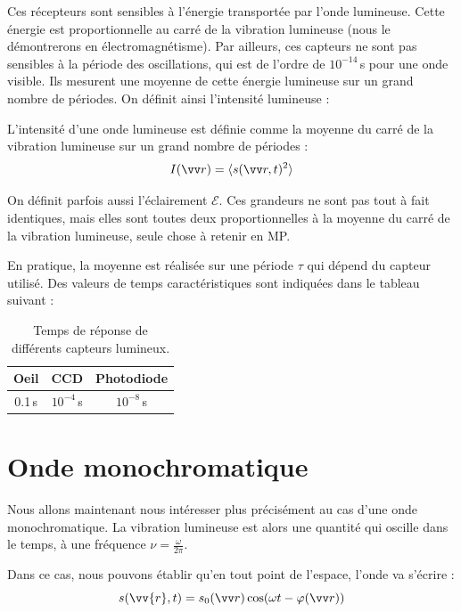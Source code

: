 \documentclass[11pt,fleqn]{book} %
\begin{document}
Ces récepteurs sont sensibles à l'énergie transportée par l'onde lumineuse. Cette énergie est proportionnelle au carré de la vibration lumineuse (nous le démontrerons en électromagnétisme). Par ailleurs, ces capteurs ne sont pas sensibles à la période des oscillations, qui est de l'ordre de $10^{-14}$\,s pour une onde visible. Ils mesurent une moyenne de cette énergie lumineuse sur un grand nombre de périodes. On définit ainsi l'intensité lumineuse :
\begin{definition}
	L'intensité d'une onde lumineuse est définie comme la moyenne du carré de la vibration lumineuse sur un grand nombre de périodes :
	\begin{equation}
		I(\vv r) = \langle s(\vv r,t)^2 \rangle
	\end{equation}
\end{definition}
\begin{remark}
	On définit parfois aussi l'éclairement $\mathcal{E}$. Ces grandeurs ne sont pas tout à fait identiques, mais elles sont toutes deux proportionnelles à la moyenne du carré de la vibration lumineuse, seule chose à retenir en MP.
\end{remark}

En pratique, la moyenne est réalisée sur une période $\tau$ qui dépend du capteur utilisé. Des valeurs de temps caractéristiques sont indiquées dans le tableau suivant :
\begin{table}[h]
	\centering \begin{tabular}{ccc}
		\toprule
		Oeil & CCD & Photodiode \\
		\midrule
		0.1\,s & $10^{-4}$\,s &$10^{-8}$\,s \\
		\bottomrule
	\end{tabular}
	\caption{Temps de réponse de différents capteurs lumineux.}
\end{table}



\section{Onde monochromatique}
Nous allons maintenant nous intéresser plus précisément au cas d'une onde monochromatique. La vibration lumineuse est alors une quantité qui oscille dans le temps, à une fréquence $\nu = \frac{\omega}{2\pi}$. 

Dans ce cas, nous pouvons établir qu'en tout point de l'espace, l'onde va s'écrire :
\begin{equation}
	s(\vv{r},t) = s_0(\vv r) \cos(\omega t - \varphi(\vv r))
\end{equation}
\end{document}
